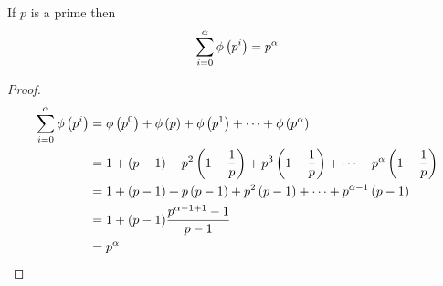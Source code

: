 \documentclass[12pt,class=book,crop=false]{standalone}
\begin{document}
\begin{thm}
    If $ p $ is a prime then 
    \[\sum_{i=0}^\alpha \phi\left( p^i \right)=p^\alpha\]
\end{thm}
\begin{proof}
    \hfill
    \begin{align*}
        \sum_{i=0}^\alpha \phi\left( p^i \right)&=\phi\left( p^0 \right)+\phi\left( p \right)+\phi\left( p^1 \right)+\dots+\phi\left( p^\alpha \right)\\
        &=1+(p-1)+p^2\left( 1-\frac{1}{p} \right)+p^3\left( 1-\frac{1}{p} \right)+\dots+p^\alpha\left( 1-\frac{1}{p} \right)\\
        &=1+(p-1)+p\left( p-1\right)+p^2\left( p-1\right)+\dots+p^{\alpha-1}\left( p-1\right)\\
        &=1+(p-1)\frac{p^{\alpha-1+1}-1}{p-1}\\
        &=p^\alpha
    \end{align*}
\end{proof}
\end{document}
